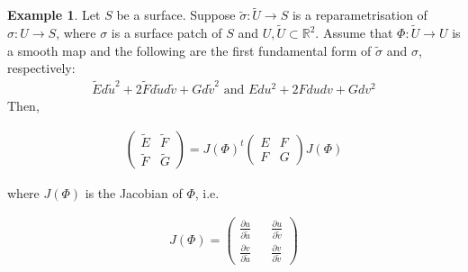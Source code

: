 \documentclass{article}
\theoremstyle{plain}
\theoremstyle{definition}
\newtheorem{example}{Example}
\theoremstyle{remark}
\newcommand{\R}{\mathbb{R}}
\begin{document}
\begin{example} \label{eg: reparmetrisation affect on the first fundamental form}
    Let \(S\) be a surface. Suppose \(\tilde{\sigma}: \tilde{U} \rightarrow S \) is a reparametrisation of \(\sigma: U \rightarrow S \), where \(\sigma\) is a surface patch of \(S\) and \( U, \tilde{U} \subset \R^2 \).
    Assume that \( \Phi: \tilde{U} \rightarrow U\) is a smooth map and the following are the first fundamental form of \(\tilde{\sigma}\) and \(\sigma\), respectively:
    \begin{align*}
        \tilde{E} d\tilde{u}^2 + 2\tilde{F} d\tilde{u} d\tilde{v} + G d\tilde{v}^2
        \text{  and  }
        E du^2 + 2F du dv + G dv^2
    \end{align*}
    Then,
\end{example}
\begin{align} \label{eq: reparmetrisation affect on the first fundamental form}
    \begin{pmatrix}
        \tilde{E} & \tilde{F} \\
        \tilde{F} & \tilde{G}
    \end{pmatrix}
    =
    J(\Phi)^t
    \begin{pmatrix}
        E & F \\
        F & G
    \end{pmatrix}
    J(\Phi)
\end{align}

where \( J(\Phi) \) is the Jacobian of \(\Phi\), i.e.

\begin{align*}
    J(\Phi) =
    \begin{pmatrix}
        \frac{\partial u}{ \partial \tilde{u}} &  & \frac{\partial u}{ \partial \tilde{v}} \\
        \frac{\partial v}{ \partial \tilde{u}} &  & \frac{\partial v}{ \partial \tilde{v}}
    \end{pmatrix}
\end{align*}
\end{document}
